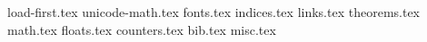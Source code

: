 
{load-first.tex}
{unicode-math.tex}
{fonts.tex}
{indices.tex}
{links.tex}
{theorems.tex}
{math.tex}
{floats.tex}
{counters.tex}
{bib.tex}
{misc.tex}
